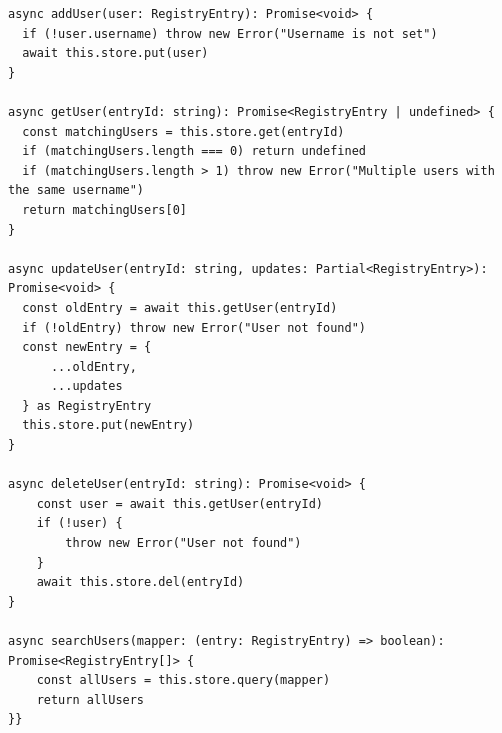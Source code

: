 \begin{verbatim}
async addUser(user: RegistryEntry): Promise<void> {
  if (!user.username) throw new Error("Username is not set")
  await this.store.put(user)
}

async getUser(entryId: string): Promise<RegistryEntry | undefined> {
  const matchingUsers = this.store.get(entryId)
  if (matchingUsers.length === 0) return undefined
  if (matchingUsers.length > 1) throw new Error("Multiple users with the same username")
  return matchingUsers[0]
}

async updateUser(entryId: string, updates: Partial<RegistryEntry>): Promise<void> {
  const oldEntry = await this.getUser(entryId)
  if (!oldEntry) throw new Error("User not found")
  const newEntry = {
      ...oldEntry,
      ...updates
  } as RegistryEntry
  this.store.put(newEntry)
}

async deleteUser(entryId: string): Promise<void> {
    const user = await this.getUser(entryId)
    if (!user) {
        throw new Error("User not found")
    }
    await this.store.del(entryId)
}

async searchUsers(mapper: (entry: RegistryEntry) => boolean): Promise<RegistryEntry[]> {
    const allUsers = this.store.query(mapper)
    return allUsers
}}
\end{verbatim}

